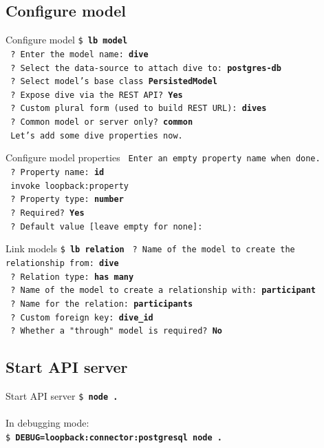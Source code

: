 \documentclass[11pt]{beamer}
\begin{document}
\subsection{Configure model}
\begin{frame}{Configure model}
\texttt{\$ \textbf{lb model}}\\
\texttt{ ? Enter the model name: \textbf{dive}}\\
\texttt{ ? Select the data-source to attach dive to: \textbf{postgres-db}}\\
\texttt{ ? Select model's base class \textbf{PersistedModel}}\\
\texttt{ ? Expose dive via the REST API? \textbf{Yes}}\\
\texttt{ ? Custom plural form (used to build REST URL): \textbf{dives}}\\
\texttt{ ? Common model or server only? \textbf{common}}\\
\texttt{ Let's add some dive properties now.}
\end{frame}
\begin{frame}{Configure model properties}
\texttt{    Enter an empty property name when done.}\\
\texttt{    ? Property name: \textbf{id}}\\
\texttt{       invoke   loopback:property}\\
\texttt{    ? Property type: \textbf{number}}\\
\texttt{    ? Required? \textbf{Yes}}\\
\texttt{    ? Default value [leave empty for none]: }
\end{frame}
\begin{frame}[fragile]{Link models}
\texttt{\$ \textbf{lb relation}}
\texttt{    ? Name of the model to create the relationship from:  \textbf{dive}}\\
\texttt{    ? Relation type: \textbf{has many}}\\
\texttt{    ? Name of the model to create a relationship with: \textbf{participant}}\\
\texttt{    ? Name for the relation: \textbf{participants}}\\
\texttt{    ? Custom foreign key: \textbf{dive\_id}}\\
\texttt{    ? Whether a "through" model is required? \textbf{No}}
\end{frame}

\subsection{Start API server}
\begin{frame}{Start API server}
\texttt{\$ \textbf{node .}}\\
~\\
In debugging mode:\\
\texttt{\$ \textbf{DEBUG=loopback:connector:postgresql node .}}
\end{frame}
\end{document}

